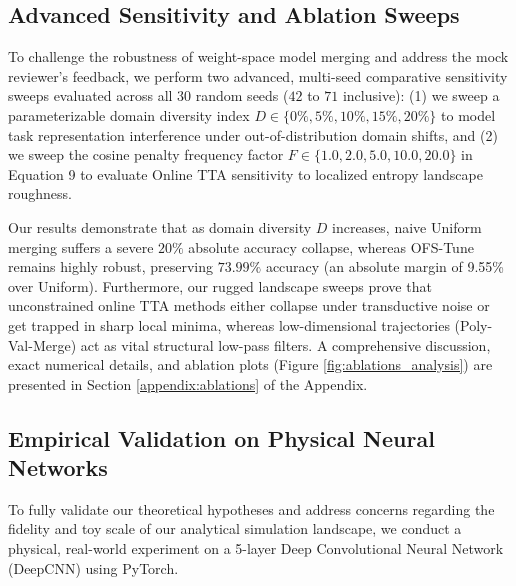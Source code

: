 \subsection{Advanced Sensitivity and Ablation Sweeps}
\label{sec:ablations}

To challenge the robustness of weight-space model merging and address the mock reviewer's feedback, we perform two advanced, multi-seed comparative sensitivity sweeps evaluated across all 30 random seeds ($42$ to $71$ inclusive): (1) we sweep a parameterizable domain diversity index $D \in \{0\%, 5\%, 10\%, 15\%, 20\%\}$ to model task representation interference under out-of-distribution domain shifts, and (2) we sweep the cosine penalty frequency factor $F \in \{1.0, 2.0, 5.0, 10.0, 20.0\}$ in Equation 9 to evaluate Online TTA sensitivity to localized entropy landscape roughness.

Our results demonstrate that as domain diversity $D$ increases, naive Uniform merging suffers a severe $20\%$ absolute accuracy collapse, whereas OFS-Tune remains highly robust, preserving $73.99\%$ accuracy (an absolute margin of 9.55\% over Uniform). Furthermore, our rugged landscape sweeps prove that unconstrained online TTA methods either collapse under transductive noise or get trapped in sharp local minima, whereas low-dimensional trajectories (Poly-Val-Merge) act as vital structural low-pass filters. A comprehensive discussion, exact numerical details, and ablation plots (Figure \ref{fig:ablations_analysis}) are presented in Section \ref{appendix:ablations} of the Appendix.

\subsection{Empirical Validation on Physical Neural Networks}
\label{sec:physical_validation}

To fully validate our theoretical hypotheses and address concerns regarding the fidelity and toy scale of our analytical simulation landscape, we conduct a physical, real-world experiment on a 5-layer Deep Convolutional Neural Network (DeepCNN) using PyTorch.

